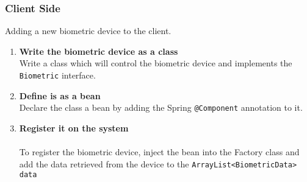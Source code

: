 \subsubsection{Client Side}
Adding a new biometric device to the client.
\begin{enumerate}
	\item \textbf{Write the biometric device as a class}
	\\Write a class which will control the biometric device and implements the \verb|Biometric| interface.
	\item \textbf{Define is as a bean}
	\\Declare the class a bean by adding the Spring  \verb!@Component! annotation to it.
	\item \textbf{Register it on the system} \\
	\\To register the biometric device, inject the bean into the Factory class and add the data retrieved from the device to the \verb|ArrayList<BiometricData> data|
\end{enumerate}